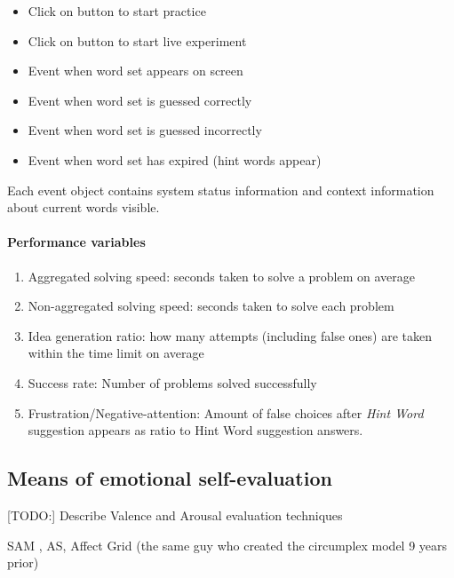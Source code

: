 		\begin{itemize}
			\item Click on button to start practice
			\item Click on button to start live experiment
			\item Event when word set appears on screen
			\item Event when word set is guessed correctly
			\item Event when word set is guessed incorrectly
			\item Event when word set has expired (hint words appear)
		\end{itemize}
	
		Each event object contains system status information and context information about current words visible.

		\paragraph{Performance variables} \label{sec:creativity-parameters}
		
		\begin{enumerate}
			\item Aggregated solving speed: seconds taken to solve a problem on average
			\item Non-aggregated solving speed: seconds taken to solve each problem
			\item Idea generation ratio: how many attempts (including false ones) are taken within the time limit on average
			\item Success rate: Number of problems solved successfully
			\item Frustration/Negative-attention: Amount of false choices after \textit{Hint Word} suggestion appears as ratio to Hint Word suggestion answers.
		\end{enumerate}
	


	\subsection{Means of emotional self-evaluation} \label{sec:selfeval}
	
	
	
	[TODO:] Describe Valence and Arousal evaluation techniques
	
	SAM , AS, Affect Grid \cite{Russell1989} (the same guy who created the circumplex model 9 years prior)
	
